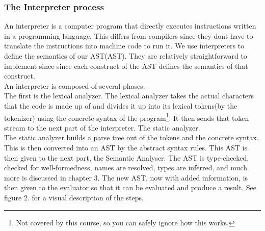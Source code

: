 \documentclass{article}
\begin{document}
        \subsubsection{The Interpreter process}
            
            An \gls{interpreter} is a computer program that directly executes instructions written in a programming language.
            This differs from \glspl{compiler} since they dont have to translate the instructions into machine code to run it. 
            We use interpreters to define the semantics of our \gls{AST}(AST). They are relatively straightforward to implement since
            since each construct of the AST defines the semantics of that construct.\\
            \newline
            An interpreter is composed of several phases. \\
            The first is the lexical analyzer. The lexical analyzer takes the actual characters that the code is made up of and divides it up into its lexical tokens(by the tokenizer) using the concrete syntax of the program\footnote{Not covered by this course, so you can safely ignore how this works.}. 
            It then sends that token stream to the next part of the interpreter. The static analyzer.\\
            The static analyzer builds a parse tree out of the tokens and the concrete syntax. This is then converted into an AST by the abstract syntax rules. This AST is then given to the next part, the Semantic Analyser.
            The AST is type-checked, checked for well-formedness, names are resolved, types are inferred, and much more is discussed in chapter 3. The new AST, now with added information, is then given to the evaluator so that it can be evaluated and produce a result.
            See figure 2. for a visual description of the steps.
\end{document}

